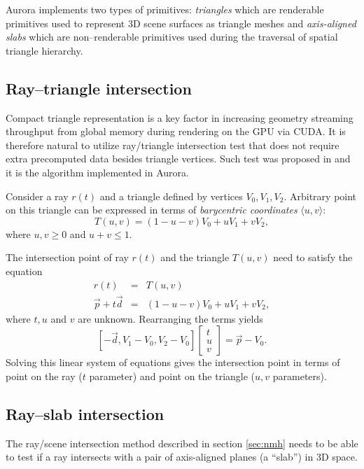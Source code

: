 Aurora implements two types of primitives: \emph{triangles} which are renderable primitives used to represent 3D scene surfaces as triangle meshes and \emph{axis-aligned slabs} which are non--renderable primitives used during the traversal of spatial triangle hierarchy. 

\subsection{Ray--triangle intersection}
Compact triangle representation is a key factor in increasing geometry streaming throughput from global memory during rendering on the GPU via CUDA. It is therefore natural to utilize ray/triangle intersection test that does not require extra precomputed data besides triangle vertices. Such test was proposed in \cite{mt97} and it is the algorithm implemented in Aurora.

Consider a ray $r(t)$ and a triangle defined by vertices $V_{0}, V_{1}, V_{2}$. Arbitrary point on this triangle can be expressed in terms of \emph{barycentric coordinates} $\langle u, v \rangle$:
\begin{equation}
  T(u,v) = (1-u-v)V_{0} + uV_{1} + vV_{2},
\end{equation}
where $u, v \ge 0$ and $u+v \le 1$.

The intersection point of ray $r(t)$ and the triangle $T(u,v)$ need to satisfy the equation
\begin{eqnarray}
  r(t) &=& T(u,v) \nonumber \\
  \vec{p} + t\vec{d} &=& (1-u-v)V_{0} + uV_{1} + vV_{2},
\end{eqnarray}
where $t, u$ and $v$ are unknown. Rearranging the terms yields
\begin{equation}
\label{eq:int_triangle}
  \left\lbrack -\vec{d}, V_{1} - V_{0}, V_{2} - V_{0} \right\rbrack
  \left\lbrack 
    \begin{array}{c}
      t\\u\\v
    \end{array}
  \right\rbrack
  = \vec{p} - V_{0}.
\end{equation}
Solving this linear system of equations gives the intersection point in terms of point on the ray ($t$ parameter) and point on the triangle ($u,v$ parameters). 

\subsection{Ray--slab intersection}
The ray/scene intersection method described in section \ref{sec:nmh} needs to be able to test if a ray intersects with a pair of axis-aligned planes (a ``slab'') in 3D space.

